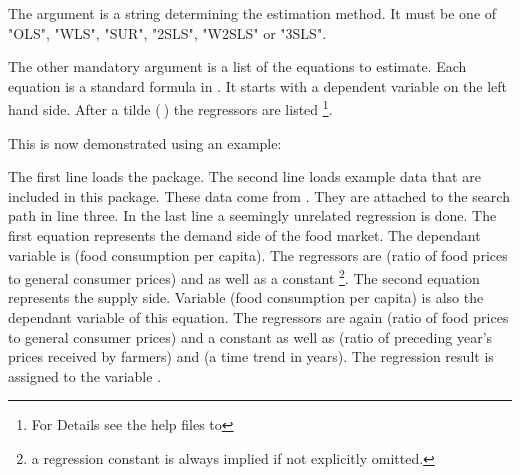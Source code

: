 \documentclass[article]{jss}
\begin{document}
The argument  is a string determining the estimation method.
It must be one of "OLS", "WLS", "SUR", "2SLS", "W2SLS" or "3SLS".

The other mandatory argument  is a list of the equations 
to estimate. 
Each equation is a standard formula in .
It starts with a dependent variable on the left hand side.
After a tilde ($~$) the regressors are listed%
\footnote{For Details see the  help files to }.

This is now demonstrated using an example: \\

The first line loads the  package. 
The second line loads example data that are included in this package.
These data come from \cite{kmenta86}.
They are attached to the  search path in line three.
In the last line a seemingly unrelated regression is done.
The first equation represents the demand side of the food market.
The dependant variable is  (food consumption per capita). 
The regressors are  (ratio of food prices to general consumer prices)
and  as well as a constant%
\footnote{a regression constant is always implied if not explicitly omitted.}.
The second equation represents the supply side.
Variable  (food consumption per capita) is also the dependant 
variable of this equation. 
The regressors are again  (ratio of food prices to general 
consumer prices) and a constant as well as 
 (ratio of preceding year's prices received by farmers) and 
 (a time trend in years).
The regression result is assigned to the variable .
\end{document}
